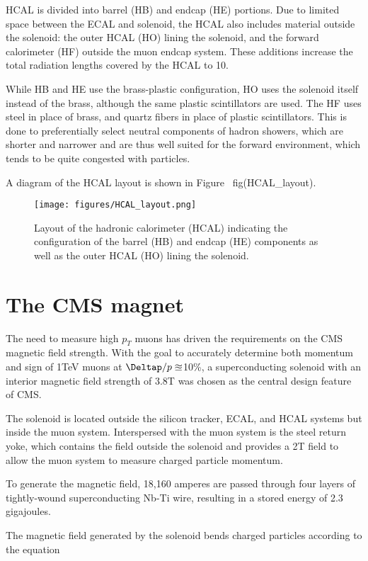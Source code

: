 HCAL is divided into barrel (HB) and endcap (HE) portions. Due to limited space between the ECAL and solenoid, the HCAL also includes material outside the solenoid: the outer HCAL (HO) lining the solenoid, and the forward calorimeter (HF) outside the muon endcap system. These additions increase the total radiation lengths covered by the HCAL to 10.

While HB and HE use the brass-plastic configuration, HO uses the solenoid itself instead of the brass, although the same plastic scintillators are used. The HF uses steel in place of brass, and quartz fibers in place of plastic scintillators. This is done to preferentially select neutral components of hadron showers, which are shorter and narrower and are thus well suited for the forward environment, which tends to be quite congested with particles.

A diagram of the HCAL layout is shown in Figure ~fig(HCAL_layout).

\begin{figure}\centering
  \texttt{[image: figures/HCAL\_layout.png]}
  \caption{\label{fig:HCAL_layout} Layout of the hadronic calorimeter (HCAL) indicating the configuration of the barrel (HB) and endcap (HE) components as well as the outer HCAL (HO) lining the solenoid.}
\end{figure}

\section{The CMS magnet}

The need to measure high $p_{T}$ muons has driven the requirements on the CMS magnetic field strength. With the goal to accurately determine both momentum and sign of 1TeV muons at $\Deltap/p \approxeq $10\%, a superconducting solenoid with an interior magnetic field strength of 3.8T was chosen as the central design feature of CMS.

The solenoid is located outside the silicon tracker, ECAL, and HCAL systems but inside the muon system. Interspersed with the muon system is the steel return yoke, which contains the field outside the solenoid and provides a 2T field to allow the muon system to measure charged particle momentum. 

To generate the magnetic field, 18,160 amperes are passed through four layers of tightly-wound superconducting Nb-Ti wire, resulting in a stored energy of 2.3 gigajoules.

The magnetic field generated by the solenoid bends charged particles according to the equation

